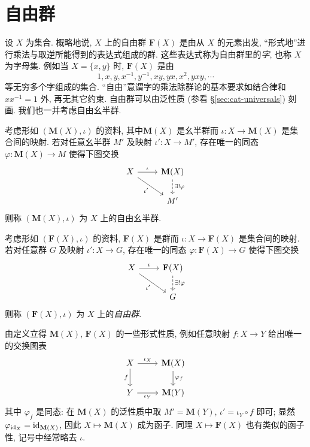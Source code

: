 \section{自由群}\label{sec:free-group}
设 $X$ 为集合. 概略地说, $X$ 上的自由群 $\mathbf{F}(X)$ 是由从 $X$ 的元素出发, ``形式地''进行乘法与取逆所能得到的表达式组成的群. 这些表达式称为自由群里的\emph{字}, 也称 $X$ 为字母集. 例如当 $X=\{x,y\}$ 时, $\mathbf{F}(X)$ 是由
\[ 1, x, y, x^{-1}, y^{-1}, xy, yx, x^2, yxy, \cdots \]
等无穷多个字组成的集合. ``自由''意谓字的乘法除群论的基本要求如结合律和 $x x^{-1}=1$ 外, 再无其它约束. 自由群可以由泛性质 (参看 \S\ref{sec:cat-universals}) 刻画. 我们也一并考虑自由幺半群.

\begin{definition}[自由幺半群]\label{def:free-monoid}
	考虑形如 $(\mathbf{M}(X), \iota)$ 的资料, 其中$\mathbf{M}(X)$ 是幺半群而 $\iota: X \to \mathbf{M}(X)$ 是集合间的映射. 若对任意幺半群 $M'$ 及映射 $\iota': X \to M'$, 存在唯一的同态 $\varphi: \mathbf{M}(X) \to M$ 使得下图交换
	\[ \begin{tikzcd}
		X \arrow[r, "\iota"] \arrow[rd, "{\iota'}"'] & \mathbf{M}(X) \arrow[dashed, d, "{\exists! \varphi}"] \\
		& M'
	\end{tikzcd} \]
	则称 $(\mathbf{M}(X), \iota)$ 为 $X$ 上的自由幺半群.
\end{definition}

\begin{definition}[自由群]\label{def:free-group}
	考虑形如 $(\mathbf{F}(X), \iota)$ 的资料, $\mathbf{F}(X)$ 是群而 $\iota: X \to \mathbf{F}(X)$ 是集合间的映射. 若对任意群 $G$ 及映射 $\iota': X \to G$, 存在唯一的同态 $\varphi: \mathbf{F}(X) \to G$ 使得下图交换
	\[ \begin{tikzcd}
		X \arrow[r, "\iota"] \arrow[rd, "{\iota'}"'] & \mathbf{F}(X) \arrow[dashed, d, "{\exists! \varphi}"] \\
		& G
	\end{tikzcd} \]
	则称 $(\mathbf{F}(X), \iota)$ 为 $X$ 上的\emph{自由群}.
\end{definition}

由定义立得 $\mathbf{M}(X)$, $\mathbf{F}(X)$ 的一些形式性质, 例如任意映射 $f: X \to Y$ 给出唯一的交换图表
\[ \begin{tikzcd}
	X \arrow[d, "f"'] \arrow[r, "{\iota_X}"] & \mathbf{M}(X) \arrow[d, "{\varphi_f}"] \\
	Y \arrow[r, "{\iota_Y}"'] & \mathbf{M}(Y)
\end{tikzcd} \]
其中 $\varphi_f$ 是同态: 在 $\mathbf{M}(X)$ 的泛性质中取 $M' = \mathbf{M}(Y)$, $\iota' = \iota_Y \circ f$ 即可; 显然 $\varphi_{\mathrm{id}_X} = \mathrm{id}_{\mathbf{M}(X)}$, 因此 $X \mapsto \mathbf{M}(X)$ 成为函子. 同理 $X \mapsto \mathbf{F}(X)$ 也有类似的函子性, 记号中经常略去 $\iota$.

